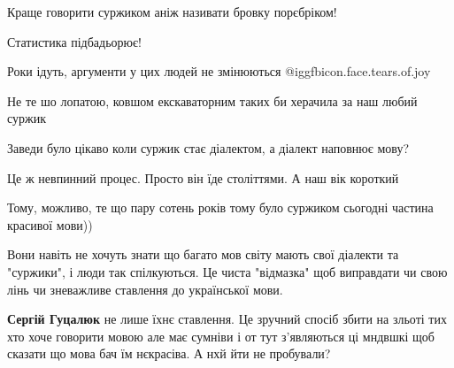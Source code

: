 Краще говорити суржиком аніж називати бровку порєбріком!

 
Статистика підбадьорює!

 
Роки ідуть, аргументи у цих людей не змінюються @igg{fbicon.face.tears.of.joy} 

 
Не те шо лопатою, ковшом екскаваторним таких би херачила за наш любий суржик

 

Заведи було цікаво коли суржик стає діалектом, а діалект наповнює мову?

Це ж невпинний процес. Просто він їде століттями. А наш вік короткий

Тому, можливо, те що пару сотень років тому було суржиком сьогодні частина
красивої мови))


 

Вони навіть не хочуть знати що багато мов світу мають свої діалекти та
"суржики", і люди так спілкуються. Це чиста "відмазка" щоб виправдати чи свою
лінь чи зневажливе ставлення до української мови.

\begin{itemize} %
 
\textbf{Сергій Гуцалюк} не лише їхнє ставлення. Це зручний спосіб збити на зльоті тих хто хоче говорити мовою але має сумніви і от тут з'являються ці мндвшкі щоб сказати що мова бач їм нєкрасіва. А нхй йти не пробували?
\end{itemize} %

